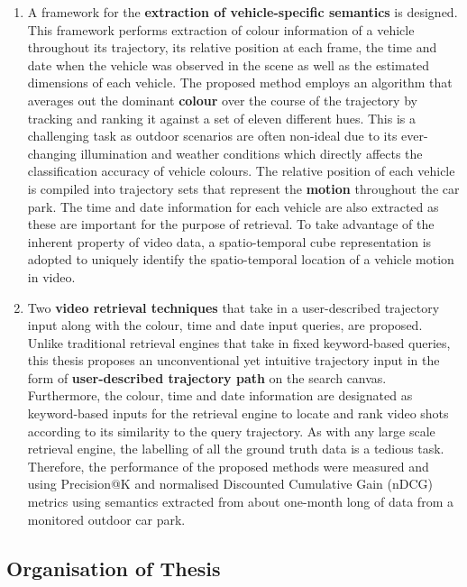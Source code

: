 \begin{enumerate}
\item A framework for the \textbf{extraction of vehicle-specific semantics} is designed. This framework performs extraction of colour information of a vehicle throughout its trajectory, its relative position %
at each frame, the time and date when the vehicle was observed in the scene %
as well as the estimated dimensions of each vehicle. The proposed method employs an algorithm that averages out the dominant \textbf{colour} over the course of the trajectory by tracking and ranking it against a set of eleven different hues. This is a challenging task as outdoor scenarios are often non-ideal due to its ever-changing illumination and weather conditions which directly affects the classification accuracy of vehicle colours. The relative position of each vehicle is compiled into trajectory sets that represent the \textbf{motion} throughout the car park. The time and date information for each vehicle are also extracted as these %
are important for the purpose of retrieval. To take advantage of the inherent property of video data, a spatio-temporal cube representation is adopted to uniquely identify the spatio-temporal location of a vehicle motion in video.
\item Two \textbf{video retrieval techniques} that take in a user-described trajectory input along with the colour, time and date input queries, are proposed. Unlike traditional retrieval engines that take in %
fixed
keyword-based queries, this thesis proposes an unconventional yet intuitive trajectory input in the form of \textbf{user-described trajectory path} on the search canvas. Furthermore, the colour, time and date information are designated as keyword-based inputs for the retrieval engine to locate and rank video shots according to its similarity to the query trajectory. As with any large scale retrieval engine, the labelling of all the ground truth data is a tedious task. %
Therefore, the performance of the proposed methods were measured and using Precision@K and normalised Discounted Cumulative Gain (nDCG) metrics using semantics extracted from about one-month long of data from a monitored outdoor car park.  
\end{enumerate}

\subsection{Organisation of Thesis}

